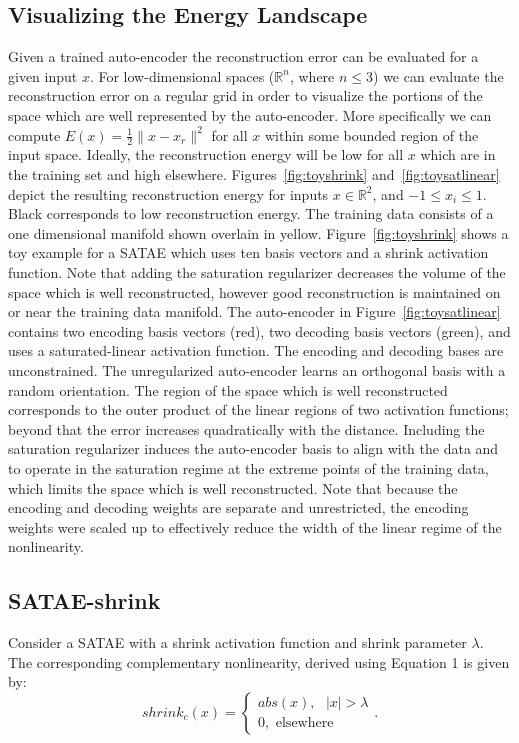 \documentclass{article} %
\begin{document}
\subsection{Visualizing the Energy Landscape}  
Given a trained auto-encoder the reconstruction error can be evaluated for a given input $x$. For low-dimensional spaces ($\mathbb{R}^n$, where $n \leq 3$) we can evaluate the reconstruction error on a regular grid in order to visualize the portions of the space which are well represented by the auto-encoder. More specifically we can compute $E(x) = \frac{1}{2} \|x - x_r \|^2$ for all $x$ within some bounded region of the input space. Ideally, the reconstruction energy will be low for all $x$ which are in the training set and high elsewhere. Figures~\ref{fig:toyshrink} and~\ref{fig:toysatlinear} depict the resulting reconstruction energy for inputs $x \in \mathbb{R}^2$, and  $-1 \leq x_i \leq 1$. Black corresponds to low reconstruction energy. The training data consists of a one dimensional manifold shown overlain in yellow. Figure~\ref{fig:toyshrink} shows a toy example for a SATAE which uses ten basis vectors and a shrink activation function. Note that adding the saturation regularizer decreases the volume of the space which is well reconstructed, however good reconstruction is maintained on or near the training data manifold. The auto-encoder in Figure~\ref{fig:toysatlinear} contains two encoding basis vectors (red), two decoding basis vectors (green), and uses a saturated-linear activation function. The encoding and decoding bases are unconstrained. The unregularized auto-encoder learns an orthogonal basis with a random orientation. The region of the space which is well reconstructed corresponds to the outer product of the linear regions of two activation functions; beyond that the error increases quadratically with the distance. Including the saturation regularizer induces the auto-encoder basis to align with the data and to operate in the saturation regime at the extreme points of the training data, which limits the space which is well reconstructed. Note that because the encoding and decoding weights are separate and unrestricted, the encoding weights were scaled up to effectively reduce the width of the linear regime of the nonlinearity. 

\subsection{SATAE-shrink}
Consider a SATAE with a shrink activation function and shrink parameter $\lambda$. The corresponding complementary nonlinearity, derived using Equation 1 is given by: 
\begin{equation} 
\nonumber
shrink_c(x) =
\begin{cases}
abs(x), \text{ } |x| > \lambda\\
0, \text{ elsewhere}
\end{cases}.
\end{equation} 
\end{document}
